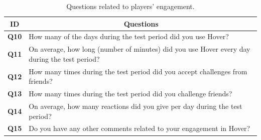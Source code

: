 \begin{table}[H]
    \centering
    \begin{tabularx}{\textwidth}{|c|X|}
        \hline
        \textbf{ID} & \multicolumn{1}{c|}{\textbf{Questions}} \\ \hline
        \textbf{Q10} & How many of the days during the test period did you use Hover? \\
        \textbf{Q11} & On average, how long (number of minutes) did you use Hover every day during the test period? \\
        \textbf{Q12} & How many times during the test period did you accept challenges from friends? \\
        \textbf{Q13} & How many times during the test period did you challenge friends? \\
        \textbf{Q14} & On average, how many reactions did you give per day during the test period? \\
        \textbf{Q15} & Do you have any other comments related to your engagement in Hover? \\ \hline
    \end{tabularx}
    \caption{Questions related to players' engagement.}
    \label{tab:appendix_player_engagement_questions}
\end{table}

